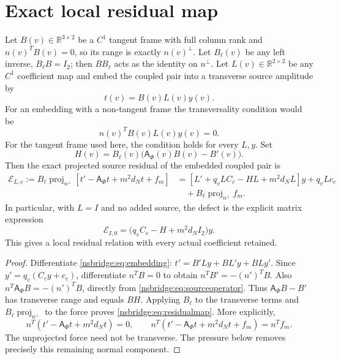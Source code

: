\documentclass[11pt]{article}
\newcommand{\R}{\mathbb R}
\newcommand{\proj}{\operatorname{proj}}
\begin{document}
\section{Exact local residual map}
Let $B(v)\in\R^{3\times2}$ be a $C^1$ tangent frame with full column rank and
$n(v)^TB(v)=0$, so its range is exactly $n(v)^\perp$.  Let $B_\ell(v)$ be any
left inverse, $B_\ell B=I_2$; then $B B_\ell$ acts as the identity on
$n^\perp$.  Let $L(v)\in\R^{2\times2}$ be any $C^1$ coefficient map and embed
the coupled pair into a transverse source amplitude by
\begin{equation}
 t(v)=B(v)L(v)y(v).
 \label{nsbridge:eq:embedding}
\end{equation}
For an embedding with a non-tangent frame the transversality condition would be
\begin{equation}
 n(v)^TB(v)L(v)y(v)=0.
 \label{nsbridge:eq:transversecondition}
\end{equation}
For the tangent frame used here, the condition holds for every $L,y$.  Set
\begin{equation}
 H(v)=B_\ell(v)\bigl(\mathsf A_\Phi(v)B(v)-B'(v)\bigr).
 \label{nsbridge:eq:Hdef}
\end{equation}
Then the exact projected source residual of the embedded coupled pair is
\begin{align}
 \mathcal E_{L,c}:=B_\ell\proj_{n^\perp}
 \left[t'-\mathsf A_\Phi t+m^2d_Nt+f_m\right]
 &=\left[L'+q_vLC_c-HL+m^2d_NL\right]y+q_vLc_c \\
 &\quad+B_\ell\proj_{n^\perp}f_m.
 \label{nsbridge:eq:residualmap}
\end{align}
In particular, with $L=I$ and no added source, the defect is the explicit
matrix expression
\begin{equation}
 \mathcal E_{I,0}=\bigl(q_vC_c-H+m^2d_NI_2\bigr)y.
 \label{nsbridge:eq:identitydefect}
\end{equation}
This gives a local residual relation with every actual coefficient retained.

\begin{proof}
Differentiate \eqref{nsbridge:eq:embedding}:
$t'=B'L y+B L'y+B L y'$.  Since $y'=q_v(C_cy+c_c)$,
differentiate $n^TB=0$ to obtain $n^TB'=-(n')^TB$. Also
$n^T\mathsf A_\Phi B=-(n')^TB$, directly from
\eqref{nsbridge:eq:sourceoperator}. Thus $\mathsf A_\Phi B-B'$ has transverse
range and equals $BH$. Applying $B_\ell$ to the transverse terms and
$B_\ell\operatorname{proj}_{n^\perp}$ to the force proves
\eqref{nsbridge:eq:residualmap}. More explicitly,
\begin{equation}
 n^T(t'-\mathsf A_\Phi t+m^2d_Nt)=0,\qquad
 n^T(t'-\mathsf A_\Phi t+m^2d_Nt+f_m)=n^Tf_m.
\end{equation}
The unprojected force need not be transverse. The pressure below removes
precisely this remaining normal component.
\end{proof}
\end{document}
